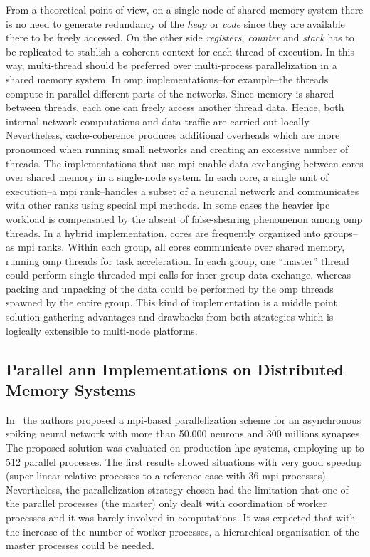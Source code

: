 \documentclass[11pt,a4paper]{article}
\begin{document}
From a theoretical point of view, on a single node of shared memory system there is no need to generate redundancy of the \emph{heap} or \emph{code} since they are available there to be freely accessed. On the other side \emph{registers}, \emph{counter} and \emph{stack} has to be replicated to stablish a coherent context for each thread of execution. In this way, multi-thread should be preferred over multi-process parallelization in a shared memory system. In \gls{omp} implementations--for example--the threads compute in parallel different parts of the networks. Since memory is shared between threads, each one can freely access another thread data. Hence, both internal network computations and data traffic are carried out locally. Nevertheless, cache-coherence produces additional overheads which are more pronounced when running small networks and creating an excessive number of threads. The implementations that use \gls{mpi} enable data-exchanging between cores over shared memory in a single-node system. In each core, a single unit of execution--a \gls{mpi} rank--handles a subset of a neuronal network and communicates with other ranks using special \gls{mpi} methods. In some cases the heavier \gls{ipc} workload is compensated by the absent of false-shearing phenomenon among \gls{omp} threads. In a hybrid implementation, cores are frequently organized into groups--as \gls{mpi} ranks. Within each group, all cores communicate over shared memory, running \gls{omp} threads for task acceleration. In each group, one “master” thread could perform single-threaded \gls{mpi} calls for inter-group data-exchange, whereas packing and unpacking of the data could be performed by the \gls{omp} threads spawned by the entire group. This kind of implementation is a middle point solution gathering advantages and drawbacks from both strategies which is logically extensible to multi-node platforms.


















\subsection{Parallel \gls{ann} Implementations on Distributed Memory Systems}

In~\cite{6821186} the authors proposed a \gls{mpi}-based parallelization scheme for an asynchronous spiking neural network with more than 50.000 neurons and 300 millions synapses. The proposed solution was evaluated on production \gls{hpc} systems, employing up to 512 parallel processes. The first results showed situations with very good speedup (super-linear relative processes to a reference case with 36 \gls{mpi} processes). Nevertheless, the parallelization strategy chosen had the limitation that one of the parallel processes (the master) only dealt with coordination of worker processes and it was barely involved in computations. It was expected that with the increase of the number of worker processes, a hierarchical organization of the master processes could be needed.
\end{document}
